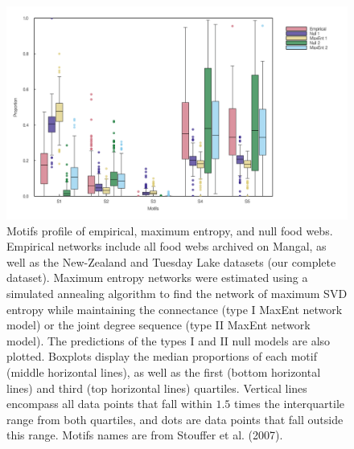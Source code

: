 \documentclass[10pt,oneside]{article}
\makeatletter
\def\maxwidth{\ifdim\Gin@nat@width>\linewidth\linewidth
\else\Gin@nat@width\fi}
\let\Oldincludegraphics\includegraphics
\renewcommand{\includegraphics}[1]{\Oldincludegraphics[width=\maxwidth]{#1}}
\makeatother
\begin{document}
\begin{figure}
\hypertarget{fig:motifs}{%
\centering
\includegraphics{figures/motifs_distribution.png}
\caption{Motifs profile of empirical, maximum entropy, and null food
webs. Empirical networks include all food webs archived on Mangal, as
well as the New-Zealand and Tuesday Lake datasets (our complete
dataset). Maximum entropy networks were estimated using a simulated
annealing algorithm to find the network of maximum SVD entropy while
maintaining the connectance (type I MaxEnt network model) or the joint
degree sequence (type II MaxEnt network model). The predictions of the
types I and II null models are also plotted. Boxplots display the median
proportions of each motif (middle horizontal lines), as well as the
first (bottom horizontal lines) and third (top horizontal lines)
quartiles. Vertical lines encompass all data points that fall within
\(1.5\) times the interquartile range from both quartiles, and dots are
data points that fall outside this range. Motifs names are from Stouffer
et al. (2007).}\label{fig:motifs}
}
\end{figure}
\end{document}
